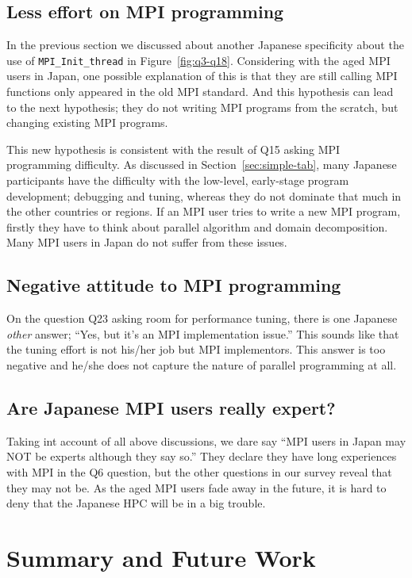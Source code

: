 \documentclass[submit,techrep,noauthor,english]{ipsj}
\begin{document}
\subsection{Less effort on MPI programming}

In the previous section we discussed about another Japanese
specificity about the use of {\tt MPI\_Init\_thread} in
Figure~\ref{fig:q3-q18}. Considering with the aged MPI users in Japan,
one possible explanation of this is that they are still calling MPI
functions only appeared in the old MPI standard. And this hypothesis
can lead to the next hypothesis; they do not writing MPI programs from
the scratch, but changing existing MPI programs.

This new hypothesis is consistent with the result of Q15 asking MPI
programming difficulty. As discussed in Section~\ref{sec:simple-tab},
many Japanese participants have the difficulty with the low-level,
early-stage program development; debugging and tuning, whereas they do
not dominate that much in the other countries or regions. If an MPI user 
tries to write a new MPI program, firstly they have to think about
parallel algorithm and domain decomposition.  Many MPI users in
Japan do not suffer from these issues.

\subsection{Negative attitude to MPI programming}

On the question Q23 asking room for performance tuning, there is one
Japanese {\it other} answer; ``Yes, but it’s an MPI implementation
issue.'' This sounds like that the tuning effort is not his/her job
but MPI implementors. This answer is too negative and he/she does not
capture the nature of parallel programming at all.

\subsection{Are Japanese MPI users really expert?}

Taking int account of all above discussions, we dare say ``MPI users
in Japan may NOT be experts although they say so.'' They declare they
have long experiences with MPI in the Q6 question, but the other
questions in our survey reveal that they may not be. As the aged MPI
users fade away in the future, it is hard to deny that the Japanese
HPC will be in a big trouble. 

\section{Summary and Future Work}
\end{document}
